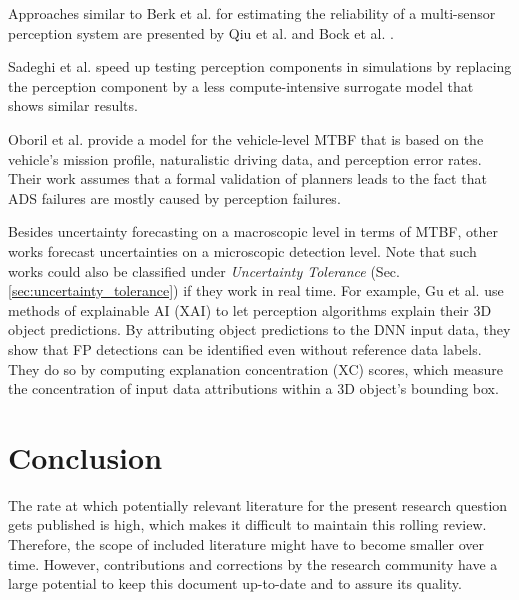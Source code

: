 \documentclass[conference]{IEEEtran}
\newcommand{\citeold}[1]{{\hypersetup{citecolor=black}\cite{#1}}}
\begin{document}
Approaches similar to Berk et al. \citeold{berk2019exploiting} for estimating the reliability of a multi-sensor perception system are presented by Qiu et al. \cite{Qiu2021reliability} and Bock et al. \cite{Bock2018reliability}.

Sadeghi et al. \cite{Sadeghi2021surrogate} speed up testing perception components in simulations by replacing the perception component by a less compute-intensive surrogate model that shows similar results. 



Oboril et al. \cite{Oboril2022mtbf_ieee} provide a model for the vehicle-level MTBF that is based on the vehicle's mission profile, naturalistic driving data, and perception error rates. 
Their work assumes that a formal validation of planners leads to the fact that ADS failures are mostly caused by perception failures.


Besides uncertainty forecasting on a macroscopic level in terms of MTBF, other works forecast uncertainties on a microscopic detection level. 
Note that such works could also be classified under \textit{Uncertainty Tolerance} (Sec. \ref{sec:uncertainty_tolerance}) if they work in real time.
For example, Gu et al. \cite{Gu2022explanations} use methods of explainable AI (XAI) to let perception algorithms explain their 3D object predictions. 
By attributing object predictions to the DNN input data, they show that FP detections can be identified even without reference data labels. 
They do so by computing explanation concentration (XC) scores, which measure the concentration of input data attributions within a 3D object's bounding box. 

\section{Conclusion}
\label{sec:conclusion}

The rate at which potentially relevant literature for the present research question gets published is high, which makes it difficult to maintain this rolling review. 
Therefore, the scope of included literature might have to become smaller over time. 
However, contributions and corrections by the research community have a large potential to keep this document up-to-date and to assure its quality.
 



{\small


}
\end{document}
